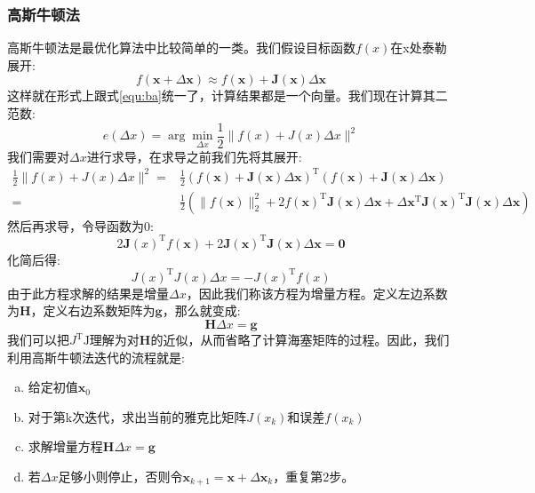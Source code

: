 \subsubsection{高斯牛顿法}
高斯牛顿法是最优化算法中比较简单的一类。我们假设目标函数$f(x)$在x处泰勒展开:
\begin{equation}
f(\boldsymbol{x}+\Delta \boldsymbol{x}) \approx f(\boldsymbol{x})+\boldsymbol{J}(\boldsymbol{x}) \Delta \boldsymbol{x}
\end{equation}
这样就在形式上跟式\ref{equ:ba}统一了，计算结果都是一个向量。我们现在计算其二范数:
\begin{equation}
e(\Delta x)=\arg \min _{\Delta x} \frac{1}{2}\|f(x)+J(x) \Delta x\|^{2}
\end{equation}
我们需要对$\Delta x$进行求导，在求导之前我们先将其展开:
\begin{equation}
\begin{aligned}
\frac{1}{2}\|f(x)+J(x) \Delta x\|^{2}=&\frac{1}{2}(f(\boldsymbol{x})+\boldsymbol{J}(\boldsymbol{x}) \Delta \boldsymbol{x})^{\mathrm{T}}(f(\boldsymbol{x})+\boldsymbol{J}(\boldsymbol{x}) \Delta \boldsymbol{x})\\
=&\frac{1}{2}\left(\|f(\boldsymbol{x})\|_{2}^{2}+2 f(\boldsymbol{x})^{\mathrm{T}} \boldsymbol{J}(\boldsymbol{x}) \Delta \boldsymbol{x}+\Delta \boldsymbol{x}^{\mathrm{T}} \boldsymbol{J}(\boldsymbol{x})^{\mathrm{T}} \boldsymbol{J}(\boldsymbol{x}) \Delta \boldsymbol{x}\right)
\end{aligned}
\end{equation}
然后再求导，令导函数为0:
\begin{equation}
2 \boldsymbol{J}(x)^{\mathrm{T}} f(\boldsymbol{x})+2 \boldsymbol{J}(\boldsymbol{x})^{\mathrm{T}} \boldsymbol{J}(\boldsymbol{x}) \Delta \boldsymbol{x}=\mathbf{0}
\end{equation}
化简后得:
\begin{equation}
J(x)^{\mathrm{T}} J(x) \Delta x=-J(x)^{\mathrm{T}} f(x)
\end{equation}
由于此方程求解的结果是增量$\Delta x$，因此我们称该方程为增量方程。定义左边系数为$\boldsymbol{H}$，定义右边系数矩阵为$\boldsymbol{g}$，那么就变成:
\begin{equation}
\boldsymbol{H} \Delta x=\boldsymbol{g}
\end{equation}
我们可以把$J^{\mathrm{T}} \mathrm{J}$理解为对$\boldsymbol{H}$的近似，从而省略了计算海塞矩阵的过程。因此，我们利用高斯牛顿法迭代的流程就是:
\begin{enumerate}[(a)]
	\item 给定初值$\boldsymbol{x}_0$
	\item 对于第k次迭代，求出当前的雅克比矩阵$J(x_k)$和误差$f(x_k)$
	\item 求解增量方程$\boldsymbol{H} \Delta x=\boldsymbol{g}$
	\item 若$\Delta x$足够小则停止，否则令$\boldsymbol{x}_{k+1}=\boldsymbol{x}+\Delta \boldsymbol{x}_k$，重复第2步。
\end{enumerate}\par
